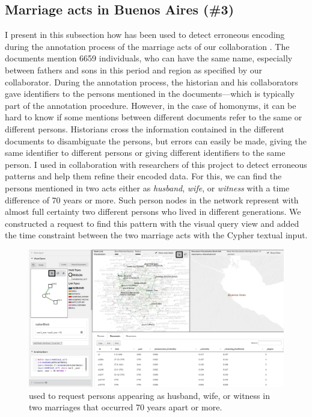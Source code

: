 \subsection{Marriage acts in Buenos Aires (\#3)}\label{subsec:usecase-BA}

I present in this subsection how \combinet has been used to detect erroneous encoding during the annotation process of the marriage acts of our collaboration \zacarias.
The documents mention 6659 individuals, who can have the same name, especially between fathers and sons in this period and region as specified by our collaborator.
During the annotation process, the historian and his collaborators gave identifiers to the persons mentioned in the documents---which is typically part of the annotation procedure.
However, in the case of homonyms, it can be hard to know if some mentions between different documents refer to the same or different persons.
Historians cross the information contained in the different documents to disambiguate the persons\cite{winchesterLinkageHistoricalRecords1970}, but errors can easily be made, \ie giving the same identifier to different persons or giving different identifiers to the same person.
I used \combinet in collaboration with researchers of this project to detect erroneous patterns and help them refine their encoded data.
For this, we can find the persons mentioned in two acts either as \textit{husband}, \textit{wife}, or \textit{witness} with a time difference of 70 years or more.
Such person nodes in the network represent with almost full certainty two different persons who lived in different generations.
We constructed a request to find this pattern with the visual query view and added the time constraint between the two marriage acts with the Cypher textual input.
\begin{figure}[!ht]
    \centering
    \includegraphics[width=\linewidth]{static/figures/ComBiNet/BuenosAires_correction}
    \caption{\name used to request persons appearing as husband, wife, or witness in two marriages that occurred 70 years apart or more.}\label{fig:combinet-BuenosAires-correction}
\end{figure}
